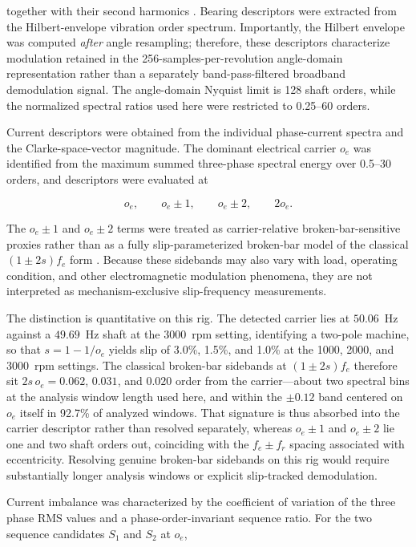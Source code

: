 \documentclass{ieeeaccess}
\begin{document}
together with their second harmonics \cite{randall2011tutorial}. Bearing
descriptors were extracted from the Hilbert-envelope vibration order
spectrum. Importantly, the Hilbert
envelope was computed \emph{after} angle resampling; therefore, these
descriptors characterize modulation retained in the 256-samples-per-revolution
angle-domain representation rather than a separately band-pass-filtered
broadband demodulation signal. The angle-domain Nyquist limit is 128 shaft
orders, while the normalized spectral ratios used here were restricted to
0.25--60 orders.

Current descriptors were obtained from the individual phase-current spectra
and the Clarke-space-vector magnitude. The dominant electrical carrier
$o_e$ was identified from the maximum summed three-phase spectral energy over
0.5--30 orders, and descriptors were evaluated at

\begin{equation}
o_e,\qquad o_e\pm1,\qquad o_e\pm2,\qquad 2o_e.
\label{eq:current_targets}
\end{equation}

The $o_e\pm1$ and $o_e\pm2$ terms were treated as carrier-relative
broken-bar-sensitive proxies rather than as a fully slip-parameterized
broken-bar model of the classical $(1\pm2s)f_e$ form
\cite{thomson2001mcsa,bellini2008advances}. Because these sidebands may also vary with load, operating
condition, and other electromagnetic modulation phenomena, they are not
interpreted as mechanism-exclusive slip-frequency measurements.

The distinction is quantitative on this rig. The detected carrier lies at
$50.06$~Hz against a $49.69$~Hz shaft at the 3000~rpm setting, identifying a
two-pole machine, so that $s = 1 - 1/o_e$ yields slip of 3.0\%, 1.5\%, and
1.0\% at the 1000, 2000, and 3000~rpm settings. The classical broken-bar
sidebands at $(1\pm2s)f_e$ therefore sit $2 s\, o_e = 0.062$, $0.031$, and
$0.020$ order from the carrier---about two spectral bins at the analysis
window length used here, and within the $\pm0.12$ band centered on $o_e$
itself in 92.7\% of analyzed windows. That signature is thus absorbed into
the carrier descriptor rather than resolved separately, whereas $o_e\pm1$ and
$o_e\pm2$ lie one and two shaft orders out, coinciding with the $f_e \pm f_r$
spacing associated with eccentricity. Resolving genuine broken-bar sidebands
on this rig would require substantially longer analysis windows or explicit
slip-tracked demodulation.

Current imbalance was characterized by the coefficient of variation of the
three phase RMS values and a phase-order-invariant sequence ratio. For the two
sequence candidates $S_1$ and $S_2$ at $o_e$,
\end{document}
